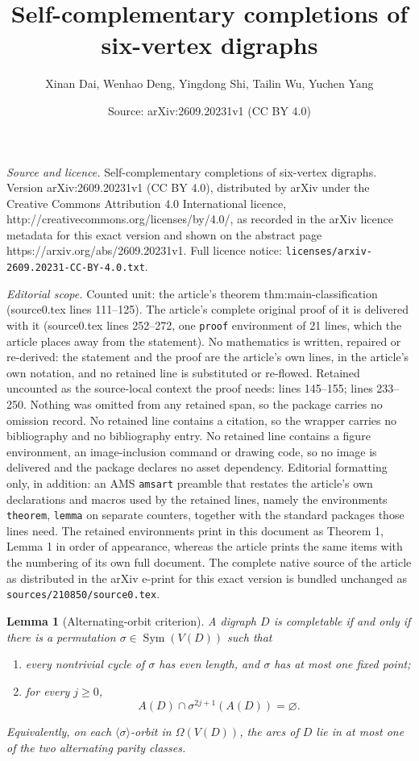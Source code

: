 \documentclass[10pt,a4paper]{amsart}
\title{Self-complementary completions of six-vertex digraphs}
\author{Xinan Dai, Wenhao Deng, Yingdong Shi, Tailin Wu, Yuchen Yang}
\date{Source: arXiv:2609.20231v1 (CC BY 4.0)}
\newtheorem{lemma}{Lemma}
\newcommand{\Sym}{\operatorname{Sym}}
\begin{document}
\maketitle

\noindent\emph{Source and licence.} Self-complementary completions of six-vertex digraphs. Version arXiv:2609.20231v1 (CC BY 4.0), distributed by arXiv under the Creative Commons Attribution 4.0 International licence, http://creativecommons.org/licenses/by/4.0/, as recorded in the arXiv licence metadata for this exact version and shown on the abstract page https://arxiv.org/abs/2609.20231v1. Full licence notice: \texttt{licenses/arxiv-2609.20231-CC-BY-4.0.txt}.\par\smallskip

\noindent\textit{Editorial scope.} Counted unit: the article's theorem thm:main-classification (source0.tex lines 111--125). The article's complete original proof of it is delivered with it (source0.tex lines 252--272, one \texttt{proof} environment of 21 lines, which the article places away from the statement). No mathematics is written, repaired or re-derived: the statement and the proof are the article's own lines, in the article's own notation, and no retained line is substituted or re-flowed.  Retained uncounted as the source-local context the proof needs: lines 145--155; lines 233--250.  Nothing was omitted from any retained span, so the package carries no omission record.  No retained line contains a citation, so the wrapper carries no bibliography and no bibliography entry.  No retained line contains a figure environment, an image-inclusion command or drawing code, so no image is delivered and the package declares no asset dependency.  Editorial formatting only, in addition: an AMS \texttt{amsart} preamble that restates the article's own declarations and macros used by the retained lines, namely the environments \texttt{theorem}, \texttt{lemma} on separate counters, together with the standard packages those lines need.  The retained environments print in this document as Theorem 1, Lemma 1 in order of appearance, whereas the article prints the same items with the numbering of its own full document.  The complete native source of the article as distributed in the arXiv e-print for this exact version is bundled unchanged as \texttt{sources/210850/source0.tex}.
\begin{lemma}[Alternating-orbit criterion]\label{lem:criterion}
A digraph \(D\) is completable if and only if there is a permutation \(\sigma\in\Sym(V(D))\) such that
\begin{enumerate}
\item every nontrivial cycle of \(\sigma\) has even length, and \(\sigma\) has at most one fixed point;
\item for every \(j\ge0\),
\begin{equation}\label{eq:odd-disjoint}
A(D)\cap \sigma^{2j+1}(A(D))=\varnothing.
\end{equation}
\end{enumerate}
Equivalently, on each \(\langle\sigma\rangle\)-orbit in \(\Omega(V(D))\), the arcs of \(D\) lie in at most one of the two alternating parity classes.
\end{lemma}
\end{document}
